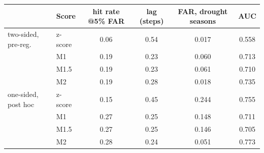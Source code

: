\begin{tabular}{llcccc}\toprule
 & Score & hit rate @5\% FAR & lag (steps) & FAR, drought seasons & AUC\\\midrule
two-sided, pre-reg. & z-score & 0.06 & 0.54 & 0.017 & 0.558\\
 & M1 & 0.19 & 0.23 & 0.060 & 0.713\\
 & M1.5 & 0.19 & 0.23 & 0.061 & 0.710\\
 & M2 & 0.19 & 0.28 & 0.018 & 0.735\\
\midrule
one-sided, post hoc & z-score & 0.15 & 0.45 & 0.244 & 0.755\\
 & M1 & 0.27 & 0.25 & 0.148 & 0.711\\
 & M1.5 & 0.27 & 0.25 & 0.146 & 0.705\\
 & M2 & 0.28 & 0.24 & 0.051 & 0.773\\
\bottomrule\end{tabular}
